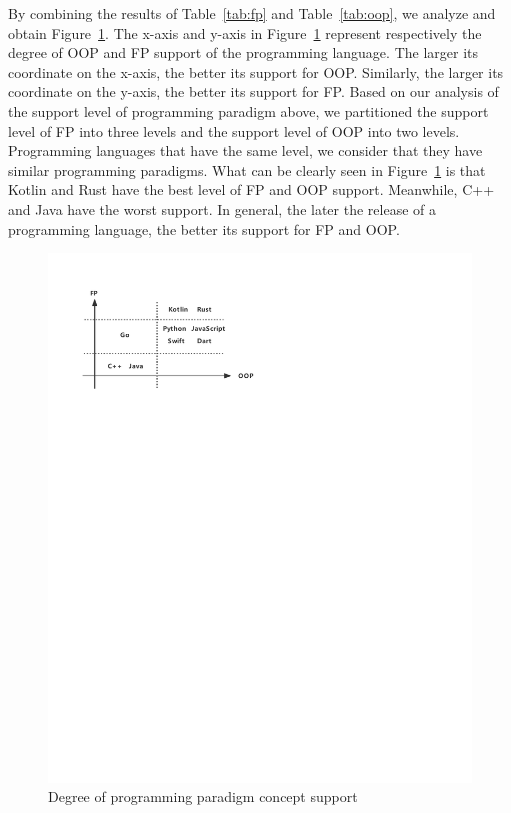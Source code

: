 By combining the results of Table~\ref{tab:fp} and Table~\ref{tab:oop},
we analyze and obtain Figure~\ref{fig:paradigm}.
The x-axis and y-axis in Figure~\ref{fig:paradigm} represent respectively
the degree of OOP and FP support of the programming language.
The larger its coordinate on the x-axis, the better its support for OOP\@.
Similarly, the larger its coordinate on the y-axis, the better its support for FP\@.
Based on our analysis of the support level of programming paradigm above,
we partitioned the support level of FP into three levels and the support level of OOP into two levels.
Programming languages that have the same level, we consider that they have similar programming paradigms.
What can be clearly seen in Figure~\ref{fig:paradigm} is that Kotlin and Rust have the best level of FP and OOP support.
Meanwhile, C++ and Java have the worst support.
In general, the later the release of a programming language,
the better its support for FP and OOP\@.

\begin{figure}[htbp]
    \centerline{\includegraphics[scale=0.8]{figures/paradigm}}
    \caption{Degree of programming paradigm concept support}
    \label{fig:paradigm}
\end{figure}

